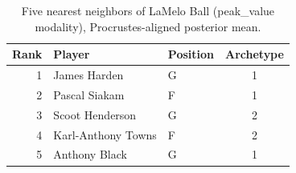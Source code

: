 \begin{table}[htbp]
  \centering\small
  \begin{tabular}{rllc}
    \toprule
    Rank & Player & Position & Archetype \\
    \midrule
    1 & James Harden & G & 1 \\
    2 & Pascal Siakam & F & 1 \\
    3 & Scoot Henderson & G & 2 \\
    4 & Karl-Anthony Towns & F & 2 \\
    5 & Anthony Black & G & 1 \\
    \bottomrule
  \end{tabular}
  \caption{Five nearest neighbors of LaMelo Ball (peak_value modality), Procrustes-aligned posterior mean.}
  \label{tab:LaMelo_Ball_neighbors_peak_value}
\end{table}


